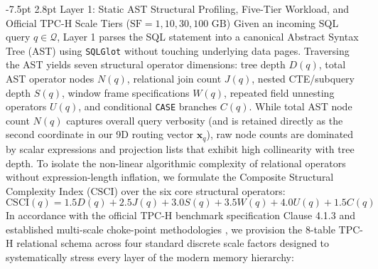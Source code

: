 \documentclass[10pt,a4paper]{article}
\makeatletter
\renewcommand\subsection{\@startsection{subsection}{2}{\z@}%
  {-7.5pt \@plus -2pt \@minus -1pt}%
  {2.8pt \@plus 1pt}%
  {\normalfont\normalsize\bfseries}}
\makeatother
\begin{document}
\subsection{Layer 1: Static AST Structural Profiling, Five-Tier Workload, and Official TPC-H Scale Tiers ($\text{SF}=1, 10, 30, 100\text{ GB}$)}
\label{sec:layer1_ast_taxonomy}\label{sec:workload_design}
Given an incoming SQL query $q \in \mathcal{Q}$, Layer 1 parses the SQL statement into a canonical Abstract Syntax Tree (AST) using \texttt{SQLGlot} \cite{mao2024sqlglot} without touching underlying data pages. Traversing the AST yields seven structural operator dimensions: tree depth $D(q)$, total AST operator nodes $N(q)$, relational join count $J(q)$, nested CTE/subquery depth $S(q)$, window frame specifications $W(q)$, repeated field unnesting operators $U(q)$, and conditional \texttt{CASE} branches $C(q)$. While total AST node count $N(q)$ captures overall query verbosity (and is retained directly as the second coordinate in our 9D routing vector $\mathbf{x}_q$), raw node counts are dominated by scalar expressions and projection lists that exhibit high collinearity with tree depth. To isolate the non-linear algorithmic complexity of relational operators without expression-length inflation, we formulate the Composite Structural Complexity Index ($\text{CSCI}$) over the six core structural operators:
\begin{equation}
    \text{CSCI}(q) = 1.5 D(q) + 2.5 J(q) + 3.0 S(q) + 3.5 W(q) + 4.0 U(q) + 1.5 C(q)
\end{equation}
In accordance with the official TPC-H benchmark specification Clause 4.1.3 \cite{tpc2022tpch} and established multi-scale choke-point methodologies \cite{boncz2014tpch, dreseler2020quantifying, kuiper2024duckdb_ooc}, we provision the 8-table TPC-H relational schema across four standard discrete scale factors designed to systematically stress every layer of the modern memory hierarchy:
\end{document}
